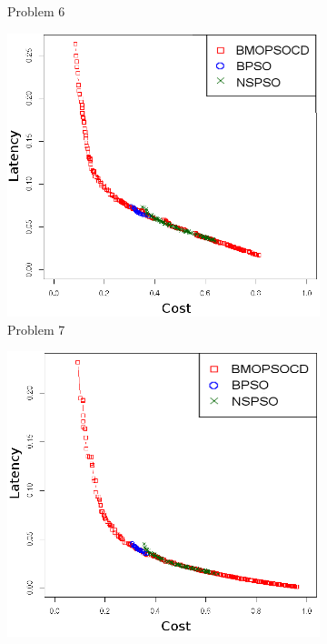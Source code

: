 \begin{figure}[]
\begin{subfigure}{0.30\textwidth}
	   \caption{Problem 6}
   \end{subfigure}
   \begin{subfigure}{0.30\textwidth}
       \includegraphics[width=\textwidth]{pics/total7.png}
	   \caption{Problem 7}
   \end{subfigure}
      \begin{subfigure}{0.30\textwidth}
       \includegraphics[width=\textwidth]{pics/total8.png}

\end{subfigure}
\end{figure}
